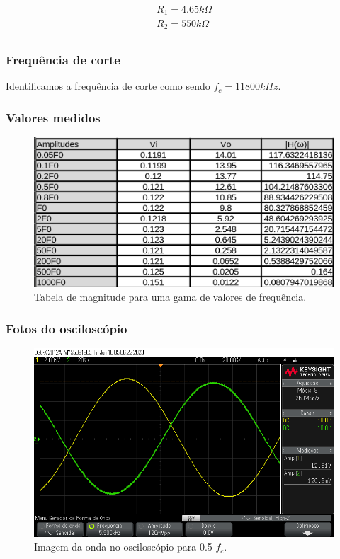 \begin{equation}
    \begin{aligned}
        R_1 = 4.65k \varOmega \\
        R_2 = 550k \varOmega  \\
    \end{aligned}
\end{equation}


\subsubsection{Frequência de corte}


Identificamos a frequência de corte como sendo $f_c = 11800 kHz$.


\subsubsection{Valores medidos}


\begin{figure}[h]
    \centering
    \includegraphics[width=1\columnwidth]{images/valores2.png}
    \caption{Tabela de magnitude para uma gama de valores de frequência.}
\end{figure}


\subsubsection{Fotos do osciloscópio}


\begin{figure}[h]
    \centering
    \includegraphics[width=1\columnwidth]{images/exemplo2_meio_fc.png}
    \caption{Imagem da onda no osciloscópio para 0.5 $f_c$.}
\end{figure}


